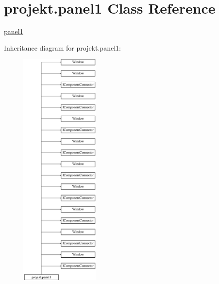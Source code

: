 \hypertarget{classprojekt_1_1panel1}{}\section{projekt.\+panel1 Class Reference}
\label{classprojekt_1_1panel1}


\mbox{\hyperlink{classprojekt_1_1panel1}{panel1}}  


Inheritance diagram for projekt.\+panel1\+:\begin{figure}[H]
\begin{center}
\leavevmode
\includegraphics[height=12.000000cm]{classprojekt_1_1panel1}
\end{center}
\end{figure}
